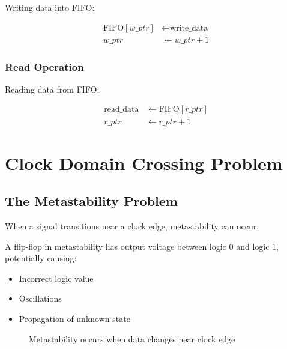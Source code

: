 \documentclass[12pt,a4paper]{article}
\begin{document}
Writing data into FIFO:

\begin{align}
\text{FIFO}[w\_ptr] &\leftarrow \text{write\_data} \\
w\_ptr &\leftarrow w\_ptr + 1
\end{align}

\subsubsection{Read Operation}

Reading data from FIFO:

\begin{align}
\text{read\_data} &\leftarrow \text{FIFO}[r\_ptr] \\
r\_ptr &\leftarrow r\_ptr + 1
\end{align}

\section{Clock Domain Crossing Problem}

\subsection{The Metastability Problem}

When a signal transitions near a clock edge, metastability can occur:

\begin{tcolorbox}[colback=red!5!white,colframe=red!75!black,title=Metastability]
A flip-flop in metastability has output voltage between logic 0 and logic 1, potentially causing:
\begin{itemize}
    \item Incorrect logic value
    \item Oscillations
    \item Propagation of unknown state
\end{itemize}
\end{tcolorbox}

\begin{figure}[h]
\centering
{}
\caption{Metastability occurs when data changes near clock edge}
\end{figure}
\end{document}
